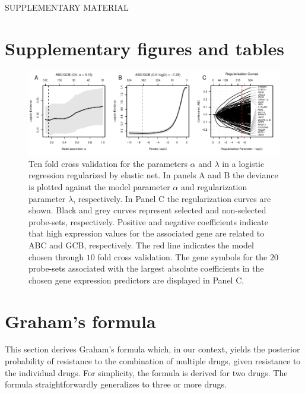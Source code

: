 %
%

{}
\begin{center}
{\huge SUPPLEMENTARY MATERIAL}\bigskip \\
{\bf \hemaClassTitle{}}
\end{center}

\section{Supplementary figures and tables}

\begin{figure}[htb]
\begin{center}
\includegraphics[width=1\textwidth]{figures/figureS1.pdf}
\end{center}
\caption{Ten fold cross validation for the parameters $\alpha$ and $\lambda$ in a logistic regression regularized by elastic net.
In panels A and B the deviance is plotted against the model parameter $\alpha$ and regularization parameter $\lambda$, respectively.
In Panel C the regularization curves are shown.
Black and grey curves represent selected and non-selected probe-sets, respectively.
Positive and negative coefficients indicate that high expression values for the associated gene are related to ABC and GCB, respectively.
The red line indicates the model chosen through $10$ fold cross validation.
The gene symbols for the $20$ probe-sets associated with the largest absolute coefficients in the chosen gene expression predictors are displayed in Panel C.}
\label{fig:crossval}
\end{figure}







\clearpage



\section{Graham's formula}
\label{sec:graham}
This section derives Graham's formula which, in our context, yields the posterior probability of resistance to the combination of multiple drugs, given resistance to the individual drugs.
For simplicity, the formula is derived for two drugs.
The formula straightforwardly generalizes to three or more drugs.

